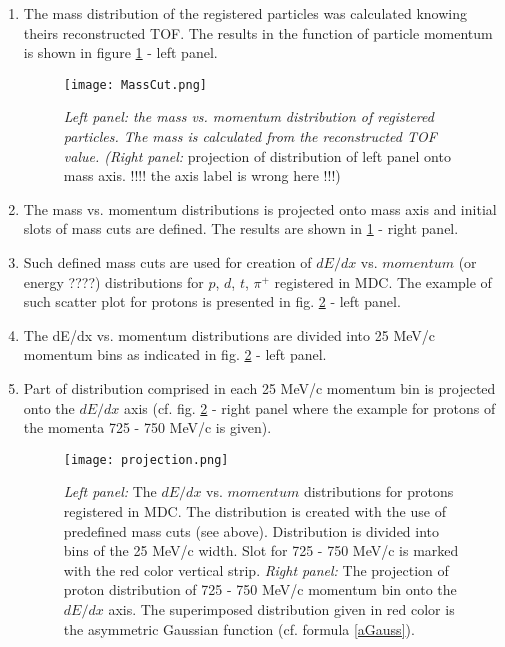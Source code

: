 \begin{enumerate}
	\item The mass distribution of the registered particles was calculated knowing theirs reconstructed TOF.  
	The results in the function of particle momentum is shown in figure \ref{MassCuts} - left panel. 
    \begin{figure}
		\centering
		\texttt{[image: MassCut.png]}
		\caption{{\it Left panel: the mass vs. momentum distribution of registered particles. The mass is calculated from the reconstructed TOF value. 
		(\it Right panel:} projection of distribution of left panel onto mass axis. !!!! the axis label is wrong here !!!) }
		\label{MassCuts}
	\end{figure}
	\item The mass vs. momentum distributions is projected onto mass axis and initial slots of mass cuts are defined. 
	The results are shown in \ref{MassCuts} - right panel. 
	\item Such defined mass cuts are used for creation of $dE/dx$ vs. $momentum$ (or energy ????) distributions for $p$, $d$, $t$, $\pi^+$ registered in MDC. 
	The example of such scatter plot for protons is presented in fig. \ref{Projec} - left panel.
    \item The dE/dx vs. momentum distributions are divided into 25 MeV/c momentum bins as indicated in fig. \ref{Projec} - left panel.
    \item Part of distribution comprised in each 25 MeV/c momentum bin is projected onto the $dE/dx$ axis 
    (cf. fig. \ref{Projec} - right panel where the example for protons of the momenta 725 - 750 MeV/c is given).
    
    \begin{figure}
		\centering
		\texttt{[image: projection.png]}
		\caption{{\it Left panel:} The $dE/dx$ vs. $momentum$ distributions for protons registered in MDC. The distribution is created with the use of predefined
		mass cuts (see above). Distribution is divided into bins of the 25 MeV/c width. Slot for 725 - 750 MeV/c is marked with the red color vertical strip.
		{\it Right panel:} The projection of proton distribution of 725 - 750 MeV/c momentum bin onto the $dE/dx$ axis. The superimposed distribution given 
		in red color is the asymmetric Gaussian function (cf. formula \ref{aGauss}). 
		}
		\label{Projec}
	\end{figure}
	

\end{enumerate}

